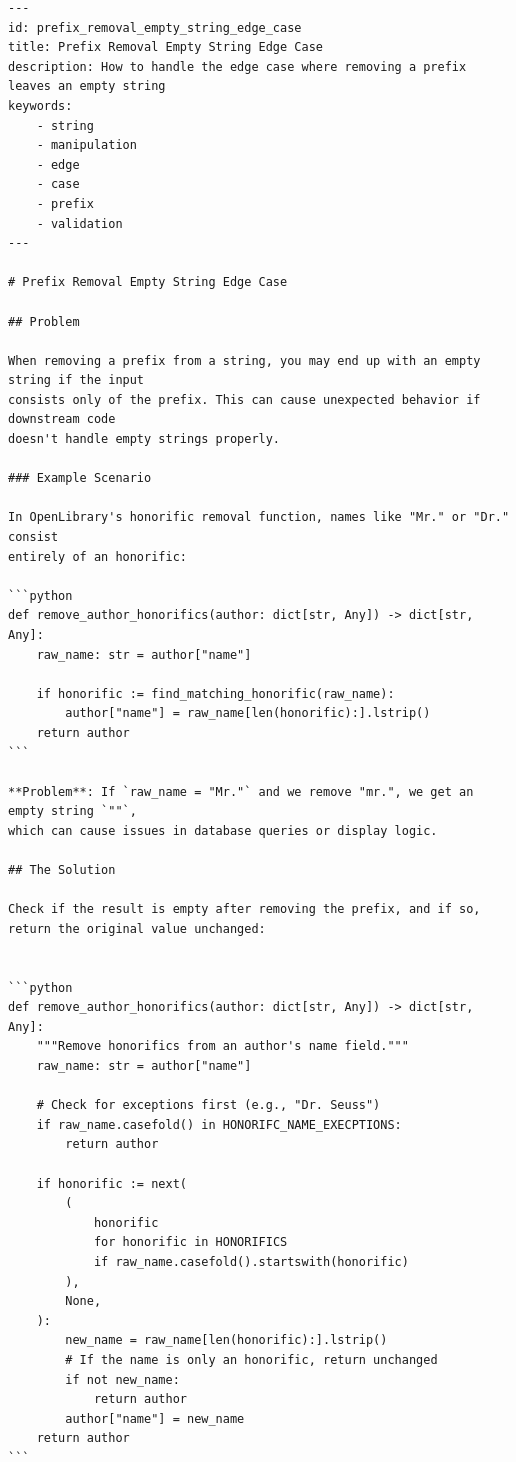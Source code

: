 \begin{tcolorbox}[colback=white,  %
                   colframe=black,    %
                   coltext=metablue,      %
                   breakable,
                   fontupper=\scriptsize\fontfamily{pcr}\selectfont]  %
\begin{verbatim}
---
id: prefix_removal_empty_string_edge_case
title: Prefix Removal Empty String Edge Case
description: How to handle the edge case where removing a prefix leaves an empty string
keywords:
    - string
    - manipulation
    - edge
    - case
    - prefix
    - validation
---

# Prefix Removal Empty String Edge Case

## Problem

When removing a prefix from a string, you may end up with an empty string if the input
consists only of the prefix. This can cause unexpected behavior if downstream code
doesn't handle empty strings properly.

### Example Scenario

In OpenLibrary's honorific removal function, names like "Mr." or "Dr." consist 
entirely of an honorific:

```python
def remove_author_honorifics(author: dict[str, Any]) -> dict[str, Any]:
    raw_name: str = author["name"]
    
    if honorific := find_matching_honorific(raw_name):
        author["name"] = raw_name[len(honorific):].lstrip()
    return author
```

**Problem**: If `raw_name = "Mr."` and we remove "mr.", we get an empty string `""`,
which can cause issues in database queries or display logic.

## The Solution

Check if the result is empty after removing the prefix, and if so, return the original value unchanged:


```python
def remove_author_honorifics(author: dict[str, Any]) -> dict[str, Any]:
    """Remove honorifics from an author's name field."""
    raw_name: str = author["name"]
    
    # Check for exceptions first (e.g., "Dr. Seuss")
    if raw_name.casefold() in HONORIFC_NAME_EXECPTIONS:
        return author
    
    if honorific := next(
        (
            honorific
            for honorific in HONORIFICS
            if raw_name.casefold().startswith(honorific)
        ),
        None,
    ):
        new_name = raw_name[len(honorific):].lstrip()
        # If the name is only an honorific, return unchanged
        if not new_name:
            return author
        author["name"] = new_name
    return author
```


\end{verbatim}
\end{tcolorbox}
